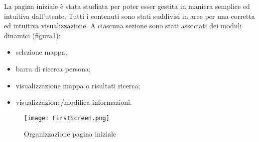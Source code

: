 La pagina iniziale è stata studiata per poter esser gestita in maniera semplice ed intuitiva dall'utente.  Tutti i contenuti sono stati suddivisi in aree  per  una  corretta  ed  intuitiva  visualizzazione. 
A  ciascuna sezione   sono   stati associati dei moduli dinamici (figura\ref{Screen:first}):
\FloatBarrier
\begin{itemize}
\item selezione mappa;
\item barra di ricerca persona;
\item visualizzazione mappa o risultati ricerca;
\item visualizzazione/modifica informazioni.
\end{itemize}

\begin{figure}[!htb]
\centering%
\texttt{[image: FirstScreen.png]}%
\caption{Organizzazione pagina iniziale}\label{Screen:first}%
\end{figure}